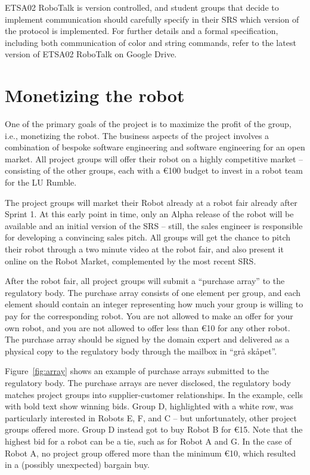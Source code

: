 \documentclass{scrreprt}
\begin{document}
ETSA02 RoboTalk is version controlled, and student groups that decide to implement communication should carefully specify in their SRS which version of the protocol is implemented. For further details and a formal specification, including both communication of color and string commands, refer to the latest version of ETSA02 RoboTalk on Google Drive.

\section{Monetizing the robot}
One of the primary goals of the project is to maximize the profit of the group, i.e., monetizing the robot. The business aspects of the project involves a combination of bespoke software engineering and software engineering for an open market. All project groups will offer their robot on a highly competitive market -- consisting of the other groups, each with a \euro 100 budget to invest in a robot team for the LU Rumble.

The project groups will market their Robot already at a robot fair already after Sprint 1. At this early point in time, only an Alpha release of the robot will be available and an initial version of the SRS -- still, the sales engineer is responsible for developing a convincing sales pitch. All groups will get the chance to pitch their robot through a two minute video at the robot fair, and also present it online on the Robot Market, complemented by the most recent SRS.

After the robot fair, all project groups will submit a ``purchase array'' to the regulatory body. The purchase array consists of one element per group, and each element should contain an integer representing how much your group is willing to pay for the corresponding robot. You are not allowed to make an offer for your own robot, and you are not allowed to offer less than \euro 10 for any other robot. The purchase array should be signed by the domain expert and delivered as a physical copy to the regulatory body through the mailbox in ``grå skåpet''.

Figure~\ref{fig:array} shows an example of purchase arrays submitted to the regulatory body. The purchase arrays are never disclosed, the regulatory body matches project groups into supplier-customer relationships. In the example, cells with bold text show winning bids. Group D, highlighted with a white row, was particularly interested in Robots E, F, and C -- but unfortunately, other project groups offered more. Group D instead got to buy Robot B for \euro 15. Note that the highest bid for a robot can be a tie, such as for Robot A and G. In the case of Robot A, no project group offered more than the minimum \euro 10, which resulted in a (possibly unexpected) bargain buy. 
\end{document}
